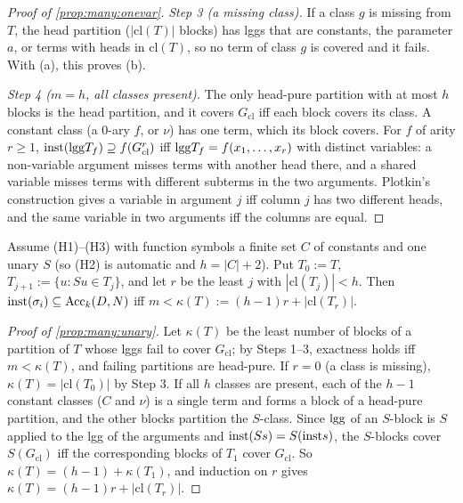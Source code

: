 \begin{proof}[Proof of \cref{prop:many:onevar}]
\emph{Step 3 (a missing class).} If a class $g$ is missing from $T$, the head partition ($|\mathrm{cl}(T)|$ blocks) has lggs
that are constants, the parameter $a$, or terms with heads in $\mathrm{cl}(T)$, so no term of class $g$ is covered and it
fails. With (a), this proves (b).

\emph{Step 4 ($m=h$, all classes present).} The only head-pure partition with at most $h$ blocks is the head partition, and
it covers $G_{\mathrm{cl}}$ iff each block covers its class. A constant class (a 0-ary $f$, or $\nu$) has one term, which
its block covers. For $f$ of arity $r\ge1$, $\mathrm{inst}(\mathrm{lgg} T_f)\supseteq f(G_{\mathrm{cl}}^r)$ iff $\mathrm{lgg} T_f=f(x_1,\dots,x_r)$
with distinct variables: a non-variable argument misses terms with another head there, and a shared variable misses terms
with different subterms in the two arguments. Plotkin's construction gives a variable in argument $j$ iff column $j$ has
two different heads, and the same variable in two arguments iff the columns are equal.
\end{proof}

\begin{proposition}\label{prop:many:unary}
Assume (H1)--(H3) with function symbols a finite set $C$ of constants and one unary $S$ (so (H2) is automatic and
$h=|C|+2$). Put $T_0:=T$, $T_{j+1}:=\{u:Su\in T_j\}$, and let $r$ be the least $j$ with $|\mathrm{cl}(T_j)|<h$. Then
$\mathrm{inst}(\sigma_i)\subseteq\mathrm{Acc}_k(D,N)$ iff $m<\kappa(T):=(h-1)r+|\mathrm{cl}(T_r)|$.
\end{proposition}

\begin{proof}[Proof of \cref{prop:many:unary}]
Let $\kappa(T)$ be the least number of blocks of a partition of $T$ whose lggs fail to cover $G_{\mathrm{cl}}$; by Steps
1--3, exactness holds iff $m<\kappa(T)$, and failing partitions are head-pure. If $r=0$ (a class is missing),
$\kappa(T)=|\mathrm{cl}(T_0)|$ by Step 3. If all $h$ classes are present, each of the $h-1$ constant classes ($C$ and
$\nu$) is a single term and forms a block of a head-pure partition, and the other blocks partition the $S$-class. Since
$\mathrm{lgg}$ of an $S$-block is $S$ applied to the lgg of the arguments and $\mathrm{inst}(Ss)=S(\mathrm{inst} s)$, the $S$-blocks cover
$S(G_{\mathrm{cl}})$ iff the corresponding blocks of $T_1$ cover $G_{\mathrm{cl}}$. So $\kappa(T)=(h-1)+\kappa(T_1)$, and
induction on $r$ gives $\kappa(T)=(h-1)r+|\mathrm{cl}(T_r)|$.
\end{proof}

